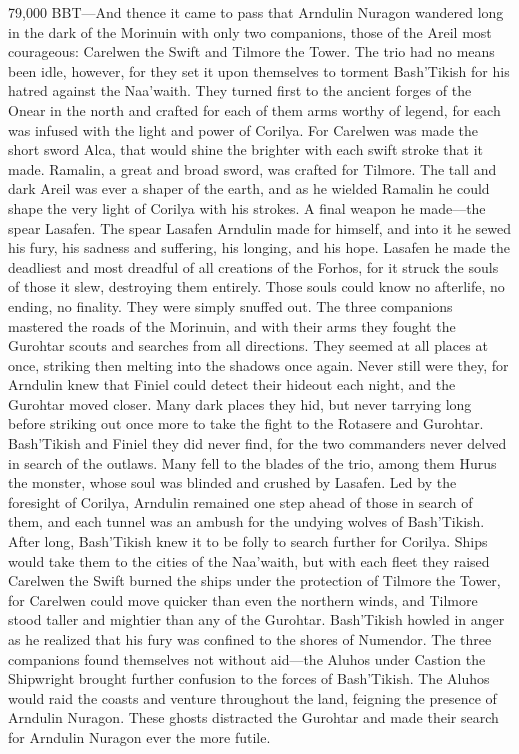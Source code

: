 \documentclass[smalldemyvopaper,11pt,twoside,onecolumn,openright,extrafontsizes]{memoir}
\begin{document}
{{79,000 BBT—And thence it came to pass that Arndulin Nuragon wandered long in the dark of the Morinuin with only two companions, those of the Areil most courageous: Carelwen the Swift and Tilmore the Tower. The trio had no means been idle, however, for they set it upon themselves to torment Bash’Tikish for his hatred against the Naa’waith. They turned first to the ancient forges of the Onear in the north and crafted for each of them arms worthy of legend, for each was infused with the light and power of Corilya. For Carelwen was made the short sword Alca, that would shine the brighter with each swift stroke that it made. Ramalin, a great and broad sword, was crafted for Tilmore. The tall and dark Areil was ever a shaper of the earth, and as he wielded Ramalin he could shape the very light of Corilya with his strokes. A final weapon he made—the spear Lasafen. The spear Lasafen Arndulin made for himself, and into it he sewed his fury, his sadness and suffering, his longing, and his hope. Lasafen he made the deadliest and most dreadful of all creations of the Forhos, for it struck the souls of those it slew, destroying them entirely. Those souls could know no afterlife, no ending, no finality. They were simply snuffed out.
	The three companions mastered the roads of the Morinuin, and with their arms they fought the Gurohtar scouts and searches from all directions. They seemed at all places at once, striking then melting into the shadows once again. Never still were they, for Arndulin knew that Finiel could detect their hideout each night, and the Gurohtar moved closer. Many dark places they hid, but never tarrying long before striking out once more to take the fight to the Rotasere and Gurohtar. Bash’Tikish and Finiel they did never find, for the two commanders never delved in search of the outlaws. Many fell to the blades of the trio, among them Hurus the monster, whose soul was blinded and crushed by Lasafen. Led by the foresight of Corilya, Arndulin remained one step ahead of those in search of them, and each tunnel was an ambush for the undying wolves of Bash’Tikish. After long, Bash’Tikish knew it to be folly to search further for Corilya. Ships would take them to the cities of the Naa’waith, but with each fleet they raised Carelwen the Swift burned the ships under the protection of Tilmore the Tower, for Carelwen could move quicker than even the northern winds, and Tilmore stood taller and mightier than any of the Gurohtar. Bash’Tikish howled in anger as he realized that his fury was confined to the shores of Numendor.
	The three companions found themselves not without aid—the Aluhos under Castion the Shipwright brought further confusion to the forces of Bash’Tikish. The Aluhos would raid the coasts and venture throughout the land, feigning the presence of Arndulin Nuragon. These ghosts distracted the Gurohtar and made their search for Arndulin Nuragon ever the more futile.
}}
\end{document}

